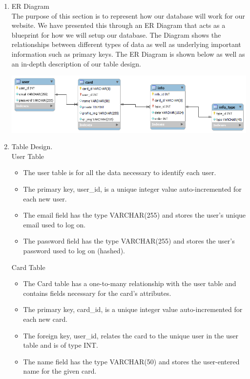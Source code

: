 \documentclass[12pt]{article}%
\begin{document}
\begin{enumerate}[4.a.]
    \item ER Diagram\\
    The purpose of this section is to represent how our database will work for our website. We have presented this through 
    an ER Diagram that acts as a blueprint for how we will setup our database. The Diagram shows the relationships between 
    different types of data as well as underlying important information such as primary keys. The ER Diagram is shown below as well 
    as an in-depth description of our table design. 
    
     \includegraphics[width=\linewidth]{er.png}
    \item Table Design.\\
    User Table
        \begin{itemize}
            \item The user table is for all the data necessary to identify each user.
            \item The primary key, user\_id, is a unique integer value auto-incremented for each new user.
            \item The email field has the type VARCHAR(255) and stores the user’s unique email used to log on.
            \item The password field has the type VARCHAR(255) and stores the user’s password used to log on (hashed).
        \end{itemize}
    Card Table
            \begin{itemize}
            \item The Card table has a one-to-many relationship with the user table and contains fields necessary for the card’s attributes.
            \item The primary key, card\_id, is a unique integer value auto-incremented for each new card.
            \item The foreign key, user\_id, relates the card to the unique user in the user table and is of type INT.
            \item The name field has the type VARCHAR(50) and stores the user-entered name for the given card.

\end{itemize}
\end{enumerate}
\end{document}
